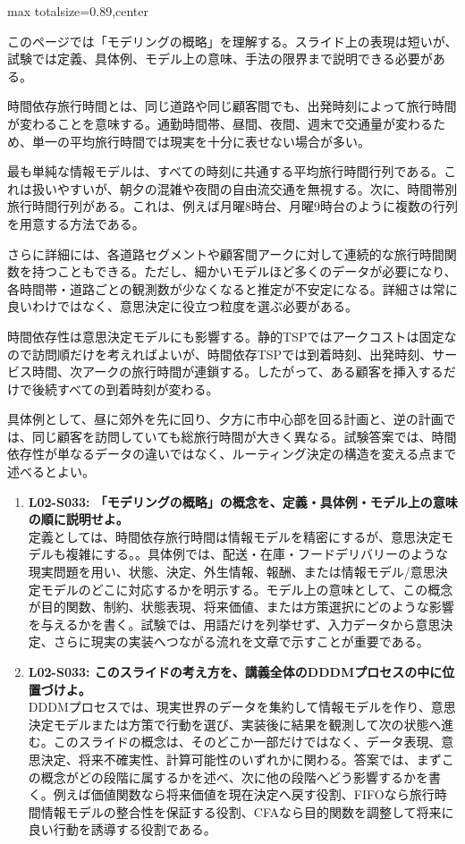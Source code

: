 \begin{minipage}[t]{0.58\textwidth}
\begin{adjustbox}{max totalsize={\textwidth}{0.89\textheight},center}
\begin{minipage}{\textwidth}\scriptsize
{}このページでは「モデリングの概略」を理解する。スライド上の表現は短いが、試験では定義、具体例、モデル上の意味、手法の限界まで説明できる必要がある。\par
時間依存旅行時間とは、同じ道路や同じ顧客間でも、出発時刻によって旅行時間が変わることを意味する。通勤時間帯、昼間、夜間、週末で交通量が変わるため、単一の平均旅行時間では現実を十分に表せない場合が多い。\par
最も単純な情報モデルは、すべての時刻に共通する平均旅行時間行列である。これは扱いやすいが、朝夕の混雑や夜間の自由流交通を無視する。次に、時間帯別旅行時間行列がある。これは、例えば月曜8時台、月曜9時台のように複数の行列を用意する方法である。\par
さらに詳細には、各道路セグメントや顧客間アークに対して連続的な旅行時間関数を持つこともできる。ただし、細かいモデルほど多くのデータが必要になり、各時間帯・道路ごとの観測数が少なくなると推定が不安定になる。詳細さは常に良いわけではなく、意思決定に役立つ粒度を選ぶ必要がある。\par
時間依存性は意思決定モデルにも影響する。静的TSPではアークコストは固定なので訪問順だけを考えればよいが、時間依存TSPでは到着時刻、出発時刻、サービス時間、次アークの旅行時間が連鎖する。したがって、ある顧客を挿入するだけで後続すべての到着時刻が変わる。\par
具体例として、昼に郊外を先に回り、夕方に市中心部を回る計画と、逆の計画では、同じ顧客を訪問していても総旅行時間が大きく異なる。試験答案では、時間依存性が単なるデータの違いではなく、ルーティング決定の構造を変える点まで述べるとよい。\par{}\begin{enumerate}\item \textbf{L02-S033: 「モデリングの概略」の概念を、定義・具体例・モデル上の意味の順に説明せよ。}\\定義としては、時間依存旅行時間は情報モデルを精密にするが、意思決定モデルも複雑にする。。具体例では、配送・在庫・フードデリバリーのような現実問題を用い、状態、決定、外生情報、報酬、または情報モデル/意思決定モデルのどこに対応するかを明示する。モデル上の意味として、この概念が目的関数、制約、状態表現、将来価値、または方策選択にどのような影響を与えるかを書く。試験では、用語だけを列挙せず、入力データから意思決定、さらに現実の実装へつながる流れを文章で示すことが重要である。\item \textbf{L02-S033: このスライドの考え方を、講義全体のDDDMプロセスの中に位置づけよ。}\\DDDMプロセスでは、現実世界のデータを集約して情報モデルを作り、意思決定モデルまたは方策で行動を選び、実装後に結果を観測して次の状態へ進む。このスライドの概念は、そのどこか一部だけではなく、データ表現、意思決定、将来不確実性、計算可能性のいずれかに関わる。答案では、まずこの概念がどの段階に属するかを述べ、次に他の段階へどう影響するかを書く。例えば価値関数なら将来価値を現在決定へ戻す役割、FIFOなら旅行時間情報モデルの整合性を保証する役割、CFAなら目的関数を調整して将来に良い行動を誘導する役割である。\end{enumerate}

\end{minipage}
\end{adjustbox}
\end{minipage}
